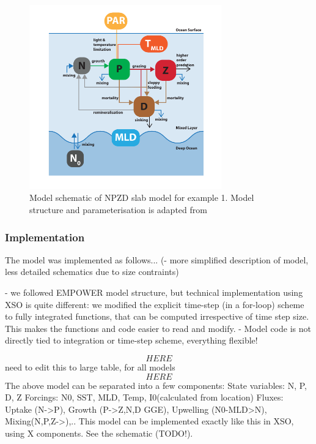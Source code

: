 \documentclass[journal abbreviation, manuscript]{copernicus}
\begin{document}
\begin{figure}[t]
\includegraphics[width=8.3cm]{Figures/firstdraft_schematics/02_schematics_EMPOWER.pdf}
\caption{Model schematic of NPZD slab model for example 1. Model structure and parameterisation is adapted
from \citet{Anderson2015c}}
\label{Figure:ModelSchematics_2}
\end{figure}



\subsubsection{Implementation}
The model was implemented as follows...
(- more simplified description of model, less detailed schematics due to size contraints)

- we followed EMPOWER model structure, but technical implementation using XSO is quite different: we modified the explicit time-step (in a for-loop) scheme to fully integrated functions, that can be computed irrespective of time step size. This makes the functions and code easier to read and modify.
- Model code is not directly tied to integration or time-step scheme, everything flexible!


$$HERE$$ need to edit this to large table, for all models $$HERE$$
The above model can be separated into a few components:
State variables: N, P, D, Z
Forcings: N0, SST, MLD, Temp, I0(calculated from location)
Fluxes: Uptake (N->P), Growth (P->Z,N,D GGE), Upwelling (N0-MLD>N), Mixing(N,P,Z->),..
This model can be implemented exactly like this in XSO, using X components. See the schematic (TODO!).
\end{document}
